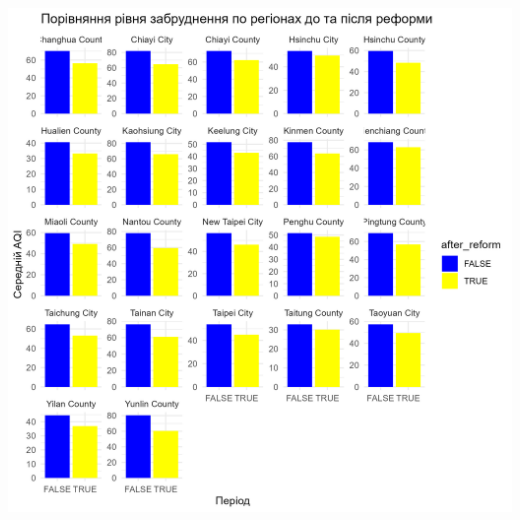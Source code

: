 \documentclass{article}
\begin{document}
\begin{enumerate}
\begin{center}
    \includegraphics[width=6in]{question5/region_comparison_aqi.png}
    \end{center}


\end{enumerate}
\end{document}
